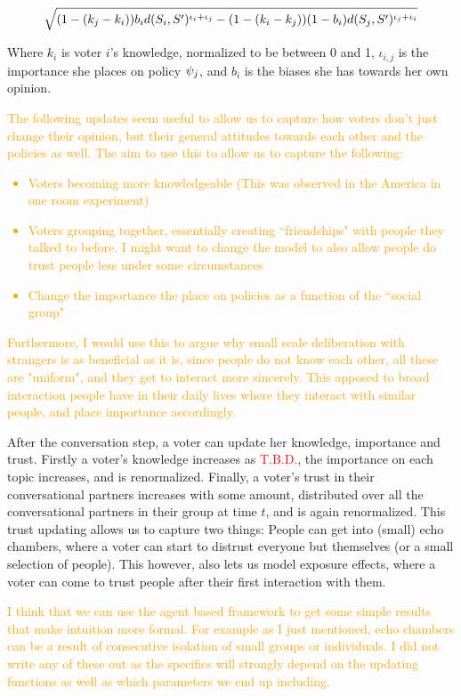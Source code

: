 \begin{equation}
	\label{eq:abm_update_function}
	\sqrt{
		(1-(k_j-k_i))b_id(S_i, S')^{\iota_i + \iota_j}
		-
		(1 - (k_i-k_j))(1-b_i)d(S_j, S')^{\iota_j + \iota_i}
	}
\end{equation}

Where $k_{i}$ is voter $i$'s knowledge, normalized to be between 0 and 1, $\iota_{i,j}$ is the importance she places on policy $\psi_{j}$, and $b_{i}$ is the biases she has towards her own opinion.

\textcolor{orange}{The following updates seem useful to allow us to capture how voters don't just change their opinion, but their general attitudes towards each other and the policies as well. The aim to use this to allow us to capture the following:}
\textcolor{orange}{
	\begin{itemize}
		\item Voters becoming more knowledgeable (This was observed in the America in one room experiment)
		\item Voters grouping together, essentially creating ``friendships" with people they talked to before. I might want to change the model to also allow people do trust people less under some circumstances
		\item Change the importance the place on policies as a function of the ``social group"
	\end{itemize}}

\textcolor{orange}{
	Furthermore, I would use this to argue why small scale deliberation with strangers is as beneficial as it is, since people do not know each other, all these are "uniform", and they get to interact more sincerely. This apposed to broad interaction people have in their daily lives where they interact with similar people, and place importance accordingly.
}

After the conversation step, a voter can update her knowledge, importance and trust. Firstly a voter's knowledge increases as \textcolor{red}{T.B.D.}, the importance on each topic increases, and is renormalized. Finally, a voter's trust in their conversational partners increases with some amount, distributed over all the conversational partners in their group at time $t$, and is again renormalized. This trust updating allows us to capture two things: People can get into (small) echo chambers, where a voter can start to distrust everyone but themselves (or a small selection of people). This however, also lets us model exposure effects, where a voter can come to trust people after their first interaction with them.

\textcolor{orange}{
	I think that we can use the agent based framework to get some simple results that make intuition more formal. For example as I just mentioned, echo chambers can be a result of consecutive isolation of small groups or individuals. I did not write any of these out as the specifics will strongly depend on the updating functions as well as which parameters we end up including.
}
